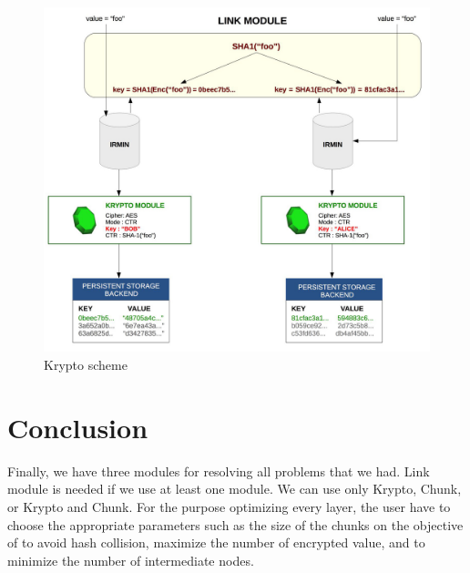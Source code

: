 \documentclass[10pt,a4paper]{report}
\begin{document}
\begin{figure}[H]
\centerline{\includegraphics[scale=0.225]{img/key-value-problem-krypto-bob.jpg}}
\caption{Krypto scheme}
\end{figure}

\chapter{Conclusion}

Finally, we have three modules for resolving all problems that we had. Link module is needed if we use at least one module. 
We can use only Krypto, Chunk, or Krypto and Chunk. 
For the purpose optimizing every layer, the user have to choose the appropriate parameters such as the size of the chunks on the objective of to avoid hash collision, maximize the number of encrypted value, and to minimize the number of intermediate nodes. 
\end{document}
